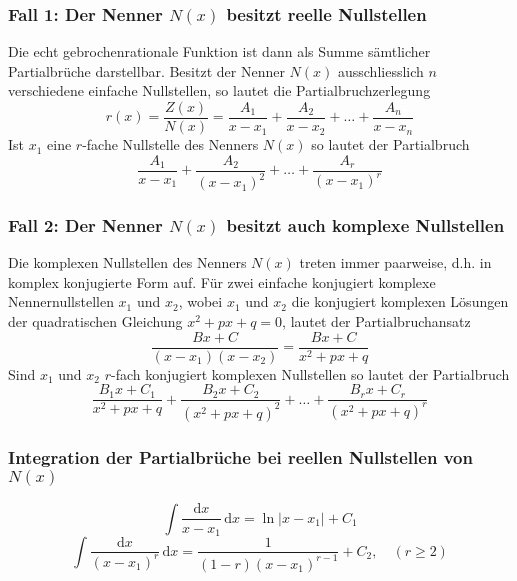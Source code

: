 \subsubsection{Fall 1: Der Nenner $N\left(x\right)$ besitzt reelle Nullstellen}
Die echt gebrochenrationale Funktion ist dann als Summe sämtlicher Partialbrüche darstellbar. Besitzt der Nenner $N\left(x\right)$ ausschliesslich $n$ verschiedene einfache Nullstellen, so lautet die Partialbruchzerlegung 
\begin{equation} 
\boxed{r\left(x\right)=\dfrac{Z\left(x\right)}{N\left(x\right)}=\dfrac{A_1}{x-x_1}+\dfrac{A_2}{x-x_2}+\dotso+\dfrac{A_n}{x-x_n}}
\end{equation}
Ist $x_1$ eine $r$-fache Nullstelle des Nenners $N\left(x\right)$ so lautet der Partialbruch
\begin{equation} 
\boxed{\dfrac{A_1}{x-x_1}+\dfrac{A_2}{\left(x-x_1\right)^2}+\dotso+\dfrac{A_r}{\left(x-x_1\right)^r}}
\end{equation} 
\subsubsection{Fall 2: Der Nenner $N\left(x\right)$ besitzt auch komplexe Nullstellen}
Die komplexen Nullstellen des Nenners $N\left(x\right)$ treten immer paarweise, d.h. in komplex konjugierte Form auf. Für zwei einfache konjugiert komplexe Nennernullstellen $x_1$ und $x_2$, wobei $x_1$ und $x_2$ die konjugiert komplexen Lösungen der quadratischen Gleichung $x^2+px+q=0$, lautet der Partialbruchansatz 
\begin{equation}
\boxed{\dfrac{Bx+C}{\left(x-x_1\right)\left(x-x_2\right)}=\dfrac{Bx+C}{x^2+px+q}}
\end{equation}
Sind $x_1$ und $x_2$ $r$-fach konjugiert komplexen Nullstellen so lautet der Partialbruch
\begin{equation}
\boxed{\dfrac{B_1x+C_1}{x^2+px+q}+\dfrac{B_2x+C_2}{\left(x^2+px+q\right)^2}+\dotso+\dfrac{B_rx+C_r}{\left(x^2+px+q\right)^r}}
\end{equation}
\subsubsection{Integration der Partialbrüche bei reellen Nullstellen von $N\left(x\right)$}
\begin{equation}
\boxed{\displaystyle \int \dfrac{\text{d}x}{x-x_1}\,\text{d}x=\ln\Big\vert x-x_1\Big\vert+C_1}
\end{equation}
\begin{equation}
\boxed{\displaystyle \int \dfrac{\text{d}x}{\left(x-x_1\right)^r}\,\text{d}x=\dfrac{1}{\left(1-r\right)\left(x-x_1\right)^{r-1}}+C_2,\quad \left(r\geq 2\right)}
\end{equation}
